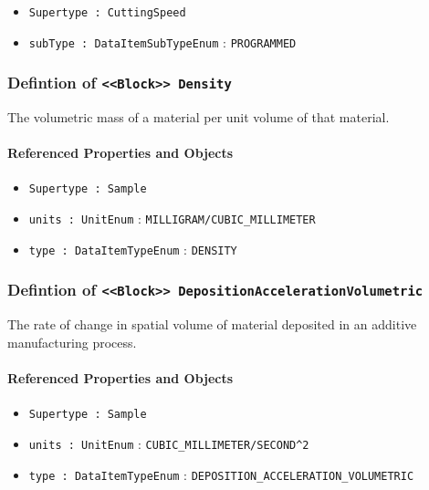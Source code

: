 \begin{itemize}
\item \texttt{Supertype : CuttingSpeed}

\item \texttt{subType : DataItemSubTypeEnum} : \texttt{PROGRAMMED}

\end{itemize}
\FloatBarrier
\subsubsection{Defintion of \texttt{<<Block>> Density}}
  \label{type:Density}

\FloatBarrier

The volumetric mass of a material per unit volume of that material.

\FloatBarrier
\paragraph{Referenced Properties and Objects}

\begin{itemize}
\item \texttt{Supertype : Sample}

\item \texttt{units : UnitEnum} : \texttt{MILLIGRAM/CUBIC_MILLIMETER}

\item \texttt{type : DataItemTypeEnum} : \texttt{DENSITY}

\end{itemize}
\FloatBarrier
\subsubsection{Defintion of \texttt{<<Block>> DepositionAccelerationVolumetric}}
  \label{type:DepositionAccelerationVolumetric}

\FloatBarrier

The rate of change in spatial volume of material deposited in an additive manufacturing process.

\FloatBarrier
\paragraph{Referenced Properties and Objects}

\begin{itemize}
\item \texttt{Supertype : Sample}

\item \texttt{units : UnitEnum} : \texttt{CUBIC_MILLIMETER/SECOND^2}

\item \texttt{type : DataItemTypeEnum} : \texttt{DEPOSITION_ACCELERATION_VOLUMETRIC}

\end{itemize}
\FloatBarrier
